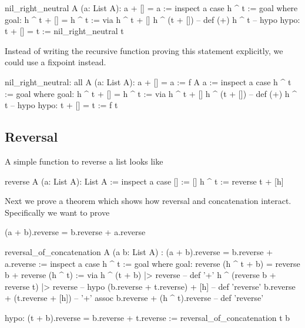 \begin{alba}
  nil_right_neutral A (a: List A): a + [] = a :=
    inspect a case
      h ^ t :=
        goal where
          goal: h ^ t + [] = h ^ t :=
            via
              h ^ t + []
              h ^ (t + [])   -- def (+)
              h ^ t          -- hypo
          hypo: t + [] = t :=
            nil_right_neutral t
\end{alba}

Instead of writing the recursive function proving this statement explicitly,
we could use a fixpoint instead.

\begin{alba}
  nil_right_neutral: all A (a: List A): a + [] = a :=
    f A a :=
      inspect a case
        h ^ t :=
          goal where
            goal: h ^ t + [] = h ^ t :=
              via
                h ^ t + []
                h ^ (t + [])   -- def (+)
                h ^ t          -- hypo
            hypo: t + [] = t :=
              f t
\end{alba}



\subsection{Reversal}



A simple function to reverse a list looks like

\begin{alba}
  reverse A (a: List A): List A :=
    inspect a case
      [] :=
        []
      h ^ t :=
        reverse t + [h]
\end{alba}


Next we prove a theorem which shows how reversal and concatenation
interact. Specifically we want to prove
\begin{alba}
  (a + b).reverse = b.reverse + a.reverse
\end{alba}

\begin{alba}
  reversal_of_concatenation
    A
    (a b: List A)
    : (a + b).reverse = b.reverse + a.reverse :=
      inspect a case
        h ^ t :=
          goal where
             goal: reverse (h ^ t + b) = reverse b + reverse (h ^ t) :=
               via
                 h ^ (t + b) |> reverse                     -- def '+'
                 h ^ (reverse b + reverse t) |> reverse     -- hypo
                 (b.reverse + t.reverse) + [h]              -- def 'reverse'
                 b.reverse + (t.reverse + [h])              -- '+' assoc
                 b.reverse + (h ^ t).reverse                -- def 'reverse'

             hypo: (t + b).reverse = b.reverse + t.reverse :=
               reversal_of_concatenation t b
\end{alba}


